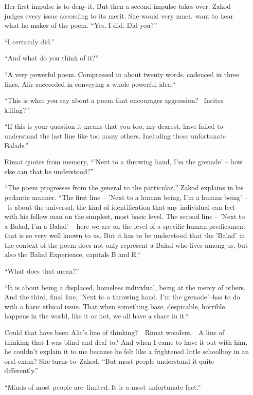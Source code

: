 \documentclass[twoside,11pt]{book}
\begin{document}
Her first impulse is to deny it. But then a second impulse takes over. Zakod judges every issue according to its merit.
She would very much\ want to hear what he makes of the poem. ``Yes. I did. Did you?''

``I certainly did.''

``And what do you think of it?'' 

``A very powerful poem. Compressed in about twenty words, cadenced in three lines, Alir succeeded in
conveying a whole powerful idea.``~ 

``This is what you say about a poem that encourages aggression? ~Incites killing?'' 

``If this is your question it means that you too, my dearest, have failed to understand the last line like
too many others. Including those unfortunate Balads.'' 

Rimat quotes from memory, ``{}'Next to a throwing hand, I'm the grenade' -- how else can that be
understood?'' 

``The poem progresses from the general to the particular,'' Zakod explains in his pedantic
manner. ``The first line -- 'Next to a human being, I'm a human being' --~is about the universal, the kind
of identification that any individual can feel with his fellow man on the simplest, most basic level. The second line
-- 'Next to a Balad, I'm a Balad{}' -- here we are on the level of a specific human predicament that is so very well
known to us. But it has to be understood that the 'Balad{}' in the context of the poem does not only represent a Balad
who lives among us, but also the Balad Experience, capitals B and E.``{\ }

{}``What does that mean?'' 

``It is about being a displaced, homeless individual, being at the mercy of others. And the third, final
line, 'Next to a throwing hand, I'm the grenade'--has to do with a basic ethical issue. That when something base,
despicable, horrible, happens in the world, like it or not, we all have a share in
it.``{\ }

Could that have been Alir's line of thinking?\ \ Rimat wonders.\ \ A line of thinking that I was blind and deaf to? And
when I came to have it out with him, he couldn't explain it to me because he felt like a frightened little schoolboy in
an oral exam? She turns to{\ }Zakod, ``But most people understand
it quite differently.'' 

``Minds of most people are~limited. It is a most unfortunate fact.'' 
\end{document}
